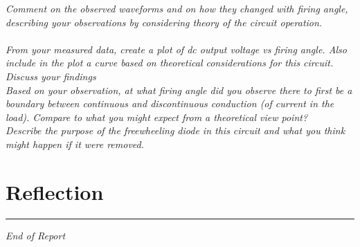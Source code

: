 \documentclass[12pt,a4paper]{article}
\begin{document}
\textit{Comment on the observed waveforms and on how they changed with firing angle, describing your observations by considering theory of the circuit operation.}\\\\

\textit{From your measured data, create a plot of dc output voltage vs firing angle. Also include in the plot
a curve based on theoretical considerations for this circuit. Discuss your findings}\\

\textit{Based on your observation, at what firing angle did you observe there to first be a boundary between
continuous and discontinuous conduction (of current in the load). Compare to what you might expect
from a theoretical view point?}\\

\textit{Describe the purpose of the freewheeling diode in this circuit and what you think might happen if it
were removed.}\\

\section{Reflection}


\vfill
\hrule
\begin{center}
\textit{End of Report}
\end{center}
\end{document}
